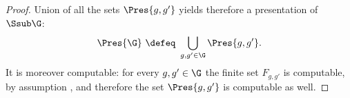 \begin{proof}

Union of all the sets $\Pres{g,g'}$ yields therefore a presentation of $\Ssub \G$:
\[
\Pres{\G} \ \defeq \ \bigcup_{g,g'\in\G}\Pres{g,g'}.
\]
It is moreover computable:
for every $g,g'\in\G$ the finite set $F_{g,g'}$ is computable, by assumption ,
and therefore the set $\Pres{g,g'}$ is computable as well.
%
%

\end{proof}
